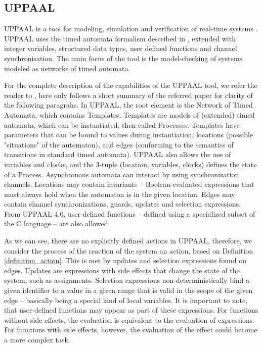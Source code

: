 \subsection{UPPAAL} \label{subsection_background_comparison_UPPAAL}
UPPAAL is a tool for modeling, simulation and verification of real-time systems \cite{UPPAALTutorial, UPPAALPresentAndFuture}. UPPAAL uses the timed automata formalism described in \cite{TimedAutomataDef}, extended with integer variables, structured data types, user defined functions and channel synchronisation. The main focus of the tool is the model-checking of systems modeled as networks of timed automata.

For the complete description of the capabilities of the UPPAAL tool, we refer the reader to \cite{UPPAALTutorial}, here only follows a short summary of the referred paper for clarity of the following paragrahs. In UPPAAL, the root element is the Network of Timed Automata, which contains Templates. Templates are models of (extended) timed automata, which can be instantiated, then called Processes. Templates have parameters that can be bound to values during instantiation, locations (possible "situations" of the automaton), and edges (conforming to the semantics of transitions in standard timed automata). UPPAAL also allows the use of variables and clocks, and the 3-tuple (location, variables, clocks) defines the state of a Process. Asynchronous automata can interact by using synchronization channels. Locations may contain invariants -- Boolean-evaluated expressions that must always hold when the automaton is in the given location. Edges may contain channel synchronizations, guards, updates and selection expressions. From UPPAAL 4.0, user-defined functions -- defined using a specialized subset of the C language -- are also allowed.

As we can see, there are no explicitly defined actions in UPPAAL, therefore, we consider the process of the reaction of the system an action, based on Definition \ref{definition_action}. This is met by updates and selection expressions found on edges. Updates are expressions with side effects that change the state of the system, such as assignments. Selection expressions non-deterministically bind a given identifier to a value in a given range that is valid in the scope of the given edge -- basically being a special kind of local variables. It is important to note, that user-defined functions may appear as part of these expressions. For functions without side effects, the evaluation is equivalent to the evaluation of expressions. For functions with side effects, however, the evaluation of the effect could become a more complex task.

